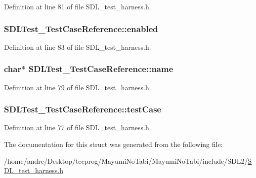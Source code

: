 Definition at line 81 of file S\-D\-L\-\_\-test\-\_\-harness.\-h.

\hypertarget{struct_s_d_l_test___test_case_reference_a15168c85e38cae7557b4beb477ef6f9a}{
\subsubsection[{enabled}]{ S\-D\-L\-Test\-\_\-\-Test\-Case\-Reference\-::enabled}}\label{struct_s_d_l_test___test_case_reference_a15168c85e38cae7557b4beb477ef6f9a}


Definition at line 83 of file S\-D\-L\-\_\-test\-\_\-harness.\-h.

\hypertarget{struct_s_d_l_test___test_case_reference_aabd588c915c52fb13bcd0c71e071a604}{
\subsubsection[{name}]{\setlength{\rightskip}{0pt plus 5cm}char$\ast$ S\-D\-L\-Test\-\_\-\-Test\-Case\-Reference\-::name}}\label{struct_s_d_l_test___test_case_reference_aabd588c915c52fb13bcd0c71e071a604}


Definition at line 79 of file S\-D\-L\-\_\-test\-\_\-harness.\-h.

\hypertarget{struct_s_d_l_test___test_case_reference_af9472f0c421a2845b540fc28fb30a3ef}{
\subsubsection[{test\-Case}]{ S\-D\-L\-Test\-\_\-\-Test\-Case\-Reference\-::test\-Case}}\label{struct_s_d_l_test___test_case_reference_af9472f0c421a2845b540fc28fb30a3ef}


Definition at line 77 of file S\-D\-L\-\_\-test\-\_\-harness.\-h.



The documentation for this struct was generated from the following file\-:\begin{DoxyCompactItemize}
\item 
/home/andre/\-Desktop/tecprog/\-Mayumi\-No\-Tabi/\-Mayumi\-No\-Tabi/include/\-S\-D\-L2/\hyperlink{_s_d_l__test__harness_8h}{S\-D\-L\-\_\-test\-\_\-harness.\-h}\end{DoxyCompactItemize}

